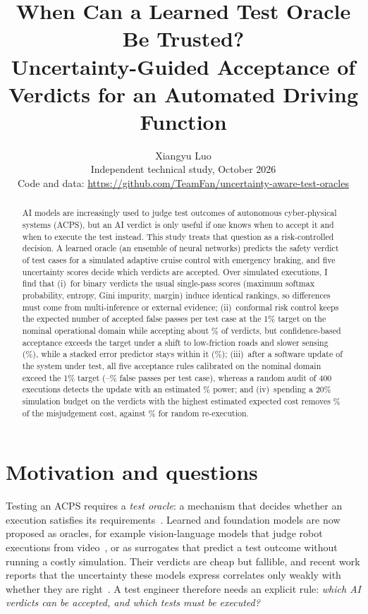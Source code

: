 \documentclass[10pt,a4paper]{article}
\title{When Can a Learned Test Oracle Be Trusted?\\[2pt]
\large Uncertainty-Guided Acceptance of Verdicts for an Automated Driving Function}
\author{Xiangyu Luo\\[2pt]\small Independent technical study, October 2026\\
\small Code and data: \url{https://github.com/TeamFan/uncertainty-aware-test-oracles}}
\date{}
\begin{document}
\maketitle

\begin{abstract}
\noindent
AI models are increasingly used to judge test outcomes of autonomous cyber-physical systems (ACPS), but an AI verdict is only useful if one knows when to accept it and when to execute the test instead. This study treats that question as a risk-controlled decision. A learned oracle (an ensemble of neural networks) predicts the safety verdict of test cases for a simulated adaptive cruise control with emergency braking, and five uncertainty scores decide which verdicts are accepted. Over \numNTotal{} simulated executions, I find that (i)~for binary verdicts the usual single-pass scores (maximum softmax probability, entropy, Gini impurity, margin) induce identical rankings, so differences must come from multi-inference or external evidence; (ii)~conformal risk control keeps the expected number of accepted false passes per test case at the 1\% target on the nominal operational domain while accepting about \numAutoConf\% of verdicts, but confidence-based acceptance exceeds the target under a shift to low-friction roads and slower sensing (\numRiskOneConf\%), while a stacked error predictor stays within it (\numRiskOneStack\%); (iii)~after a software update of the system under test, all five acceptance rules calibrated on the nominal domain exceed the 1\% target (\numRiskTwoNov--\numRiskTwoConf\% false passes per test case), whereas a random audit of 400 executions detects the update with an estimated \numAuditDetect\% power; and (iv)~spending a 20\% simulation budget on the verdicts with the highest estimated expected cost removes \numBudCostZero\% of the misjudgement cost, against \numBudRandZero\% for random re-execution.
\end{abstract}

\section{Motivation and questions}
Testing an ACPS requires a \emph{test oracle}: a mechanism that decides whether an execution satisfies its requirements~\cite{barr2015}. Learned and foundation models are now proposed as oracles, for example vision-language models that judge robot executions from video~\cite{visor2026}, or as surrogates that predict a test outcome without running a costly simulation. Their verdicts are cheap but fallible, and recent work reports that the uncertainty these models express correlates only weakly with whether they are right~\cite{visor2026}. A test engineer therefore needs an explicit rule: \emph{which AI verdicts can be accepted, and which tests must be executed?}
\end{document}

